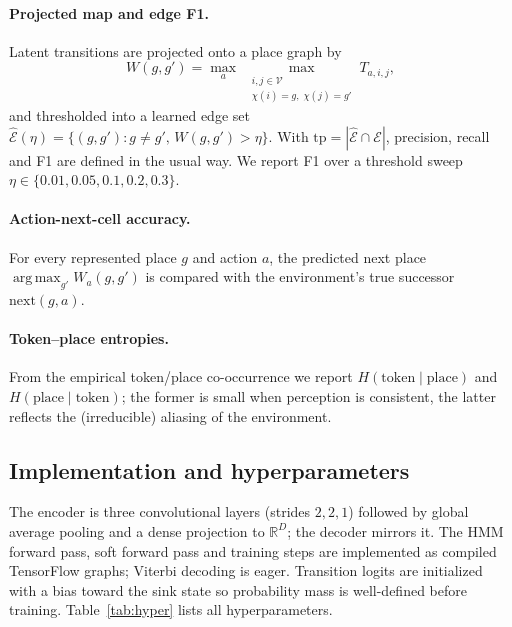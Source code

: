 \documentclass[twocolumn,10pt]{article}
\DeclareMathOperator*{\argmax}{arg\,max}
\newcommand{\R}{\mathbb{R}}
\begin{document}
\paragraph{Projected map and edge F1.}
Latent transitions are projected onto a place graph by
\begin{equation}
W(g,g')=\max_{a}\;\max_{\substack{i,j\in\mathcal{V}\\ \chi(i)=g,\;\chi(j)=g'}}
   T_{a,i,j},
\end{equation}
and thresholded into a learned edge set
$\widehat{\mathcal{E}}(\eta)=\{(g,g'):g\neq g',\,W(g,g')>\eta\}$. With
$\mathrm{tp}=|\widehat{\mathcal{E}}\cap\mathcal{E}|$, precision, recall and
F1 are defined in the usual way. We report F1 over a threshold sweep
$\eta\in\{0.01,0.05,0.1,0.2,0.3\}$.

\paragraph{Action-next-cell accuracy.}
For every represented place $g$ and action $a$, the predicted next place
$\argmax_{g'}W_a(g,g')$ is compared with the environment's true successor
$\mathrm{next}(g,a)$.

\paragraph{Token--place entropies.}
From the empirical token/place co-occurrence we report $H(\text{token}\mid
\text{place})$ and $H(\text{place}\mid\text{token})$; the former is small when
perception is consistent, the latter reflects the (irreducible) aliasing of
the environment.

\subsection{Implementation and hyperparameters}
\label{sec:impl}

The encoder is three convolutional layers (strides $2,2,1$) followed by global
average pooling and a dense projection to $\R^{D}$; the decoder mirrors it. The
HMM forward pass, soft forward pass and training steps are implemented as
compiled TensorFlow graphs; Viterbi decoding is eager. Transition logits are
initialized with a bias toward the sink state so probability mass is
well-defined before training. Table~\ref{tab:hyper} lists all hyperparameters.
\end{document}
